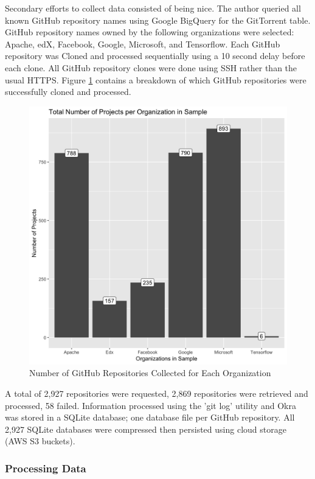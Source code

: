 \documentclass{article}
\begin{document}
Secondary efforts to collect data consisted of being nice. The author
queried all known GitHub repository names using Google BigQuery for the
GitTorrent table. GitHub repository names owned by the following
organizations were selected: Apache, edX, Facebook, Google, Microsoft,
and Tensorflow. Each GitHub repository was Cloned and processed sequentially
using a 10 second delay before each clone. All GitHub repository clones
were done using SSH rather than the usual HTTPS. Figure
\ref{fig:repos_collected} contains a breakdown of which GitHub repositories
were successfully cloned and processed.

\begin{figure}[h]
  \centering
  \includegraphics[scale=0.1]{f1}
  \caption{Number of GitHub Repositories Collected for Each Organization}
  \label{fig:repos_collected}
\end{figure}

A total of 2,927 repositories were requested, 2,869 repositories were
retrieved and processed, 58 failed. Information processed using the
'git log' utility and Okra was stored in a SQLite database; one database
file per GitHub repository. All 2,927 SQLite databases were compressed
then persisted using cloud storage (AWS S3 buckets). 

\subsubsection{Processing Data}
\end{document}
